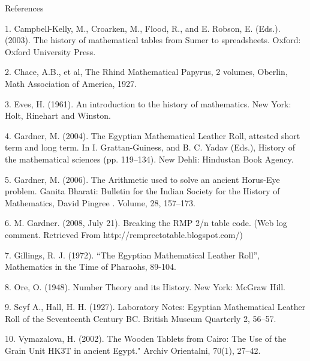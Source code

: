 \documentclass[12pt]{article}
\begin{document}
References

1. Campbell-Kelly, M., Croarken, M., Flood, R., and E. Robson, E. (Eds.). (2003). The history of mathematical tables from Sumer to spreadsheets. Oxford: Oxford University Press.

2. Chace, A.B., et al, The Rhind Mathematical Papyrus, 2 volumes, Oberlin, Math Association of America, 1927.

3. Eves, H. (1961). An introduction to the history of mathematics. New York: Holt, Rinehart and Winston.

4. Gardner, M. (2004). The Egyptian Mathematical Leather Roll, attested short term and long term. In I. Grattan-Guiness, and B. C. Yadav (Eds.), History of the mathematical sciences (pp. 119–134). New Dehli: Hindustan Book Agency.

5. Gardner, M. (2006). The Arithmetic used to solve an ancient Horus-Eye problem. Ganita Bharati: Bulletin for the Indian Society for the History of Mathematics, David Pingree .  Volume, 28, 157–173.

6. M. Gardner. (2008, July 21). Breaking the RMP 2/n table code. (Web log comment. Retrieved
	From http://remprectotable.blogspot.com/)

7. Gillings, R. J. (1972). “The Egyptian Mathematical Leather Roll”, Mathematics in the Time of Pharaohs, 89-104.

8. Ore, O. (1948).  Number Theory and its History. New York: McGraw Hill.

9. Seyf A., Hall, H. H. (1927). Laboratory Notes: Egyptian Mathematical Leather Roll of the Seventeenth Century BC. British Museum Quarterly 2, 56–57.

10. Vymazalova, H. (2002). The Wooden Tablets from Cairo: The Use of the Grain Unit HK3T in ancient Egypt." Archiv Orientalni, 70(1), 27–42.
\end{document}
